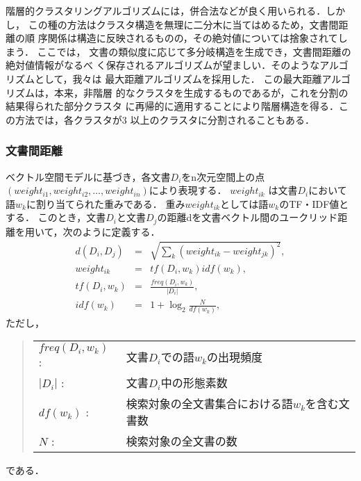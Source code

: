 階層的クラスタリングアルゴリズムには，併合法などが良く用いられる\cite{Frakes:InformationRetrieval}．しかし，
この種の方法はクラスタ構造を無理に二分木に当てはめるため，文書間距離の順
序関係は構造に反映されるものの，その絶対値については捨象されてしまう．
ここでは，
文書の類似度に応じて多分岐構造を生成でき，文書間距離の絶対値情報がなるべ
く保存されるアルゴリズムが望ましい．そのようなアルゴリズムとして，我々は
最大距離アルゴリズム\cite{長尾:パターン情報処理}を採用した．
この最大距離アルゴリズムは，本来，非階層
的なクラスタを生成するものであるが，これを分割の結果得られた部分クラスタ
に再帰的に適用することにより階層構造を得る．この方法では，各クラスタが3
以上のクラスタに分割されることもある．

\subsubsection{文書間距離}
\label{Sec:文書間距離}

ベクトル空間モデルに基づき，各文書$D_i$をn次元空間上の点$(weight_{i1},weight_{i2},\ldots,weight_{in})$により表現する．
$weight_{ik}$ は文書$D_i$において語$w_k$に割り当てられた重みである．
重み$weight_{ik}$としては語$w_k$のTF・IDF値とする．
このとき，文書$D_i$と文書$D_j$の距離dを文書ベクトル間のユークリッド距離を用いて，次のように定義する．
\begin{eqnarray}
  d(D_i, D_j) & = &\sqrt{\sum_{k} (weight_{ik} - weight_{jk})^2},\\
 weight_{ik} & = & tf(D_i,w_k)idf(w_k), \nonumber\\
 tf(D_i,w_k) & = & \frac{freq(D_i,w_k)}{|D_i|}, \nonumber\\
 idf(w_k)  & = & 1 + \log_2 \frac{N}{df(w_k)},\nonumber
\end{eqnarray}
ただし，
\begin{quote}
  \begin{tabular}{ll}
   $freq(D_i,w_k)$ : & 文書$D_i$での語$w_k$の出現頻度\\
   $|D_i|$ :& 文書$D_i$中の形態素数\\
   $df(w_k)$  :& 検索対象の全文書集合における語$w_k$を含む文書数\\
   $N$ :& 検索対象の全文書の数
  \end{tabular}
\end{quote}
である．

